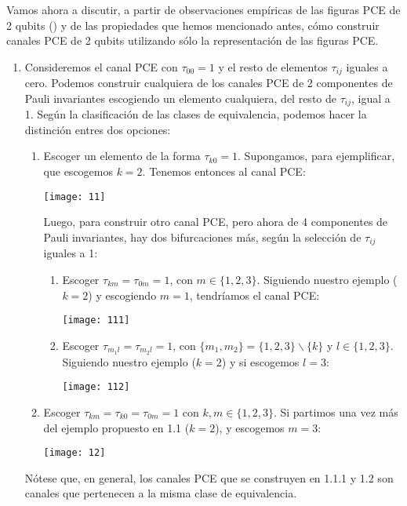 Vamos ahora a discutir, a partir de observaciones empíricas de las figuras PCE 
de 2 qubits () 
y de las propiedades que hemos mencionado antes, 
cómo construir canales PCE de 2 qubits utilizando sólo la representación
de las figuras PCE.
\begin{enumerate}
	\item Consideremos el canal PCE con $\tau_{00}=1$ y el resto de elementos
	$\tau_{ij}$ iguales a cero. Podemos construir cualquiera de los canales PCE 
	de 2 componentes de Pauli invariantes escogiendo un elemento cualquiera, del resto de 
	$\tau_{ij}$, igual a 1. Según la clasificación de las clases de equivalencia, 
	podemos hacer la distinción entres dos opciones:
	\begin{enumerate}
		\item Escoger un elemento de la forma $\tau_{k 0}=1$. Supongamos, 
		para ejemplificar, que escogemos $k=2$. Tenemos entonces 
		al canal PCE: 
		\begin{center}
			\texttt{[image: 11]}
		\end{center}
		Luego, para construir otro canal PCE, pero ahora de 4 componentes de Pauli invariantes, hay
		dos bifurcaciones más, según la selección de $\tau_{ij}$ iguales a 1:
		\begin{enumerate}
			\item Escoger $\tau_{km}=\tau_{0m}=1$, con $m\in\{1,2,3\}$.
			Siguiendo nuestro ejemplo ($k=2$) y escogiendo $m=1$, tendríamos el canal PCE:
			\begin{center}
				\texttt{[image: 111]}
			\end{center}
			\item Escoger $\tau_{m_1l}=\tau_{m_2l}=1$, con 
			$\{m_1,m_2\}= \{1,2,3\}\backslash\{k\}$ y $l\in \{1,2,3\}$. 
			Siguiendo nuestro ejemplo ($k=2$) y si escogemos $l=3$:
			\begin{center}
				\texttt{[image: 112]}
			\end{center}
		\end{enumerate}
		
		\item Escoger $\tau_{km}=\tau_{k0}=\tau_{0m}=1$ con $k,m\in\{1,2,3\}$.
		Si partimos una vez más del ejemplo propuesto en 1.1 ($k=2$), y 
		escogemos $m=3$:
		\begin{center}
				\texttt{[image: 12]}
			\end{center}
	\end{enumerate}
	Nótese que, en general, los canales PCE que se construyen en 1.1.1 y 1.2 son canales 
	que pertenecen a la misma clase de equivalencia.


\end{enumerate}
